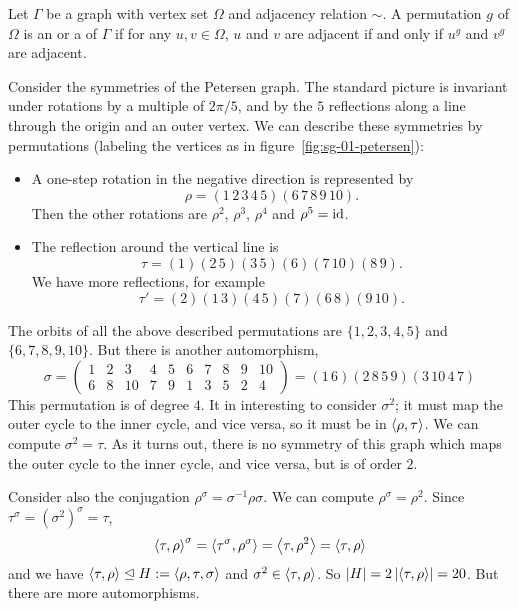 
\begin{definition}
  Let $\Gamma$ be a graph with vertex set $\Omega$ and adjacency relation
  $\sim$.
  A permutation $g$ of $\Omega$ is an  or a 
  of $\Gamma$ if for any $u, v \in \Omega$, $u$ and $v$ are adjacent if and only if $u^g$
  and $v^g$ are adjacent.
\end{definition}

\begin{example}
  Consider the symmetries of the Petersen graph.
  The standard picture is invariant under rotations by a multiple of $2 \pi /
  5$, and by the $5$ reflections along a line through the origin and an outer
  vertex.
  We can describe these symmetries by permutations (labeling the vertices as in
  figure~\ref{fig:sg-01-petersen}):
  \begin{itemize}
  \item A one-step rotation in the negative direction is represented by
	\[
	  \rho = (1\,2\,3\,4\,5) (6\,7\,8\,9\,10).
	\]
	Then the other rotations are $\rho^2$, $\rho^3$, $\rho^4$ and $\rho^5 =
	\operatorname{id}$.
  \item The reflection around the vertical line is
	\[
	  \tau = (1) (2\,5) (3\,5) (6) (7\,10) (8\,9).
	\]
	We have more reflections, for example
	\[
	  \tau' = (2) (1\,3) (4\,5) (7) (6\,8) (9\,10).
	\]
  \end{itemize}
  The orbits of all the above described permutations are $\{1,2,3,4,5\}$ and
  $\{6,7,8,9,10\}$.
  But there is another automorphism,
  \[
	\sigma =
	\begin{pmatrix}
	  1 & 2 & 3  & 4 & 5 & 6 & 7 & 8 & 9 & 10 \\
	  6 & 8 & 10 & 7 & 9 & 1 & 3 & 5 & 2 & 4
	\end{pmatrix}
	= (1\,6) (2\,8\,5\,9) (3\,10\,4\,7)
  \]
  This permutation is of degree $4$.
  It in interesting to consider $\sigma^2$; it must map the outer cycle to the
  inner cycle, and vice versa, so it must be in $\left< \rho, \tau \right>$.
  We can compute $\sigma^2 = \tau$.
  As it turns out, there is no symmetry of this graph which maps the outer cycle
  to the inner cycle, and vice versa, but is of order $2$.

  Consider also the conjugation $\rho^\sigma = \sigma^{-1} \rho \sigma$.
  We can compute $\rho^\sigma = \rho^2$.
  Since $\tau^\sigma = (\sigma^2)^\sigma = \tau$,
  \[
	\left< \tau, \rho \right>^\sigma = \left< \tau^\sigma, \rho^\sigma \right> = \left< \tau, \rho^2 \right>
	= \left< \tau, \rho \right>
  \]
  and we have $\left< \tau, \rho \right> \trianglelefteq H := \left< \rho, \tau, \sigma \right>$ and
  $\sigma^2 \in \left< \tau, \rho \right>$.
  So $\left| H \right| = 2 \left| \left< \tau, \rho \right> \right| = 20$.
  But there are more automorphisms.


\end{example}
